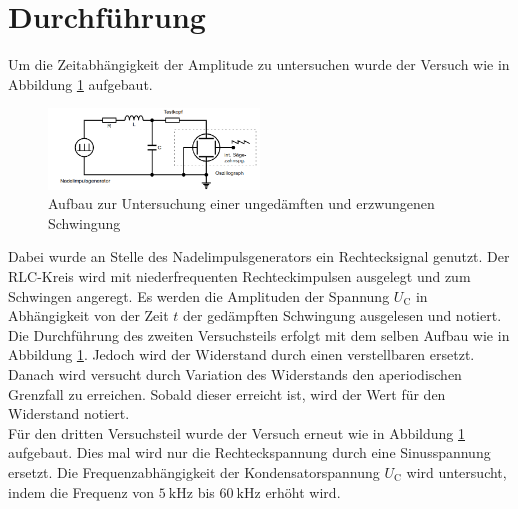 \section{Durchführung}
\label{sec:Durchführung}
Um die Zeitabhängigkeit der Amplitude zu untersuchen wurde der Versuch wie in Abbildung \ref{fig:aufb a} aufgebaut.
\begin{figure}
    \centering
    \caption{Aufbau zur Untersuchung einer ungedämften und erzwungenen Schwingung \cite{v354}} 
    \label{fig:aufb a}
    \includegraphics[width = 0.5\textwidth]{pics/aufb.png}
\end{figure}
Dabei wurde an Stelle des Nadelimpulsgenerators ein Rechtecksignal genutzt. 
Der RLC-Kreis wird mit niederfrequenten Rechteckimpulsen ausgelegt und zum Schwingen angeregt.
Es werden die Amplituden der Spannung $U_\text{C}$ in Abhängigkeit von der Zeit $t$ der gedämpften Schwingung ausgelesen und notiert.
\\
Die Durchführung des zweiten Versuchsteils erfolgt mit dem selben Aufbau wie in Abbildung \ref{fig:aufb a}.
Jedoch wird der Widerstand durch einen verstellbaren ersetzt. Danach wird versucht durch Variation des Widerstands den aperiodischen Grenzfall zu erreichen.
Sobald dieser erreicht ist, wird der Wert für den Widerstand notiert.
\\
Für den dritten Versuchsteil wurde der Versuch erneut wie in Abbildung \ref{fig:aufb a} aufgebaut. Dies mal wird nur die Rechteckspannung durch eine Sinusspannung ersetzt.
Die Frequenzabhängigkeit der Kondensatorspannung $U_\text{C}$ wird untersucht, indem die Frequenz von $\SI{5}{\kilo \hertz}$ bis $\SI{60}{\kilo \hertz}$ erhöht wird.


